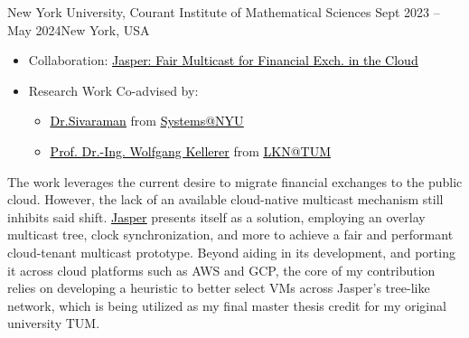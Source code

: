 \documentclass[10pt,a4paper,ragged2e,withhyper]{altacv}
\begin{document}
\begin{paracol}{2}

        {New York University, Courant Institute of Mathematical Sciences}
        {Sept 2023 -- May 2024}{New York, USA}
\begin{itemize}
\item Collaboration: \href{https://arxiv.org/abs/2402.09527}{{\textcolor{black}{\underline{Jasper: Fair Multicast for Financial Exch. in the Cloud}}}}
\item Research Work Co-advised by:
    \begin{itemize}
        \item \href{https://anirudhsk.github.io/}{{\textcolor{black}{\underline{Dr.Sivaraman}}}} from \href{https://news.cs.nyu.edu/}{{\textcolor{black}{\underline{Systems@NYU}}}}
        \item \href{https://www.ce.cit.tum.de/en/lkn/team/staff/kellerer-wolfgang/}{{\textcolor{black}{\underline{Prof. Dr.-Ing. Wolfgang Kellerer}}}} from \href{https://www.ce.cit.tum.de/en/lkn/home/}{{\textcolor{black}{\underline{LKN@TUM}}}}
    \end{itemize}
\end{itemize}
The work leverages the current desire to migrate financial exchanges to the public cloud. 
However, the lack of an available cloud-native multicast mechanism still inhibits said shift.
\href{https://arxiv.org/abs/2402.09527}{{\textcolor{black}{\underline{Jasper}}}} presents itself as 
a solution, employing an overlay multicast tree, clock synchronization, and more
to achieve a fair and performant cloud-tenant multicast prototype. 
Beyond aiding in its development, and porting it across cloud platforms such as AWS and GCP, 
the core of my contribution relies on developing a heuristic to better select VMs across Jasper's tree-like network, which is 
being utilized as my final master thesis credit for my original university TUM.
%


\end{paracol}
\end{document}
